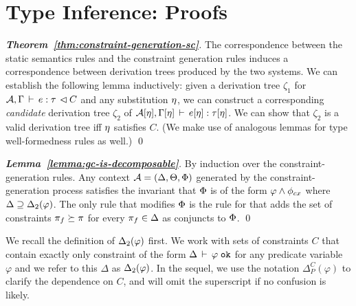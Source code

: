 \newcommand{\deltaPC}{\Delta_P^C}

\section{Type Inference: Proofs}


\begin{proof}[\textbf{Theorem~\ref{thm:constraint-generation-sc}}]
The correspondence between the static semantics rules and the constraint generation
rules induces a correspondence between derivation trees produced by the
two systems.
We can establish the following lemma inductively:
given a derivation tree $\zeta_1$ for
${{\mathcal{A}},\Gamma} \, \vdash \, {e} : {\tau} \, \lhd {C}$
and any substitution $\eta$,
we can construct a corresponding \emph{candidate} derivation
tree $\zeta_2$ of ${\mathcal{A}}[\eta],\Gamma[\eta]\,\vdash\,e[\eta]:\tau[\eta]$.
We can show that $\zeta_2$ is a valid derivation tree iff $\eta$ satisfies $C$.
(We make use of analogous lemmas for type well-formedness rules as well.)
\qed
\end{proof}


\begin{proof}[\textbf{Lemma~\ref{lemma:gc-is-decomposable}}]
  By induction over the constraint-generation rules.
  Any context ${\mathcal{A}} = (\Delta,\Theta,\Phi)$ generated by the constraint-generation
  process satisfies the invariant that $\Phi$ is of the form $\varphi \wedge \phi_{cx}$
  where $\Delta \supseteq {\Delta_2}(\varphi)$.
  The only rule that modifies $\Phi$ is the rule for 
  that adds the set of constraints $\pi_f \succeq \pi$ for every $\pi_f \in \Delta$
  as conjuncts to $\Phi$.
\qed
\end{proof}

We recall the definition of ${\Delta_2}(\varphi)$ first. We work with sets of constraints $C$ that
contain exactly only constraint of the form  $\Delta\,\vdash\,\varphi \; \texttt{ok}$ for any predicate variable $\varphi$
and we refer to this $\Delta$ as ${\Delta_2}(\varphi)$. In the sequel, we use the notation
$\deltaPC(\varphi)$ to clarify the dependence on $C$, and will omit the superscript if no confusion
is likely.


